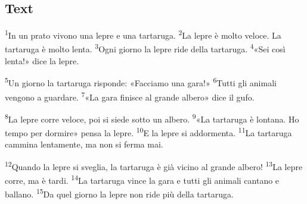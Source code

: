 \documentclass[11pt,a4paper,twoside,openright]{book}
\newenvironment{storytext}{\par\begingroup\large\setlength{\parskip}{8pt}\linespread{1.15}\selectfont}{\par\endgroup}
\newcommand{\sentnum}[1]{\textsuperscript{\color{muted}\tiny #1}}
\begin{document}
\subsection*{Text}
\begin{storytext}
\sentnum{1}In un prato vivono una lepre e una tartaruga. \sentnum{2}La lepre è molto veloce. La tartaruga è molto lenta. \sentnum{3}Ogni giorno la lepre ride della tartaruga. \sentnum{4}«Sei così lenta!» dice la lepre.\par
\sentnum{5}Un giorno la tartaruga risponde: «Facciamo una gara!» \sentnum{6}Tutti gli animali vengono a guardare. \sentnum{7}«La gara finisce al grande albero» dice il gufo.\par
\sentnum{8}La lepre corre veloce, poi si siede sotto un albero. \sentnum{9}«La tartaruga è lontana. Ho tempo per dormire» pensa la lepre. \sentnum{10}E la lepre si addormenta. \sentnum{11}La tartaruga cammina lentamente, ma non si ferma mai.\par
\sentnum{12}Quando la lepre si sveglia, la tartaruga è già vicino al grande albero! \sentnum{13}La lepre corre, ma è tardi. \sentnum{14}La tartaruga vince la gara e tutti gli animali cantano e ballano. \sentnum{15}Da quel giorno la lepre non ride più della tartaruga.\par
\end{storytext}
\end{document}
